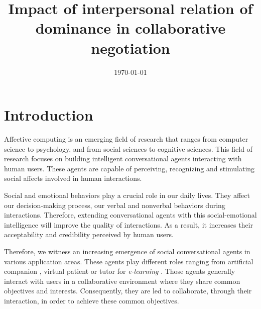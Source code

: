 \documentclass[10pt, a4paper]{article} %
\title{Impact of interpersonal relation of dominance in collaborative negotiation} %
\date{\today} %
\begin{document}
\maketitle %

\thispagestyle{firstpage} %




\section{Introduction}

Affective computing is an emerging field of research that ranges from computer science to psychology, and from social sciences to cognitive sciences. This field of research focuses on building intelligent conversational agents interacting with human users. These agents are capable of perceiving, recognizing and stimulating social affects involved in human interactions.

Social and emotional behaviors play a crucial role in our daily lives. They affect our decision-making process, our verbal and nonverbal behaviors during interactions. Therefore, extending conversational agents with this social-emotional intelligence will improve the quality of interactions. As a result, it increases their acceptability and credibility perceived by human users. 

Therefore, we witness an increasing emergence of social conversational agents in various application areas.  These agents play different roles ranging from artificial companion \cite{ring2013addressing,sidner2013always}, virtual patient \cite{kenny2007virtual,kleinheksel2017virtual} or tutor for \emph{e-learning}  \cite{kerly2008calmsystem,kerry2009conversational}. Those agents generally interact with users in a collaborative environment where they share common objectives and interests. 
Consequently, they are led to collaborate, through their interaction, in order to achieve these common objectives. 
\end{document}
